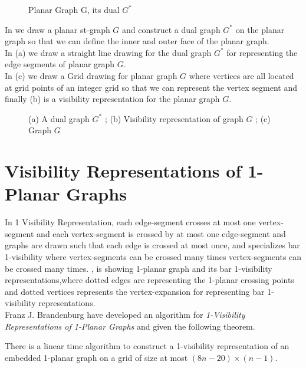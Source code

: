 \begin{figure}[!tb]
\centering
\resizebox{80mm}{!}{}
\caption{Planar Graph G, its dual $G^{*}$}
\label{fig:barvisidual}
\end{figure}




In  we draw a planar st-graph $G$ and construct a dual graph $G^{*}$ on the planar graph so that we can define the inner and outer face of the planar graph.
\\
In  (a) we draw a straight line drawing for the dual graph $G^{*}$ for representing the edge segments of planar graph $G$.
\\
In  (c) we draw a Grid drawing for planar graph $G$ where vertices are all located at grid points of an integer grid so that we can represent the vertex segment and finally  (b) is a visibility representation for the planar graph $G$.




\begin{figure}[!tb]
\centering
\resizebox{100mm}{!}{}
\caption{(a) A dual graph $G^{*}$ ; (b) Visibility representation of graph $G$ ; (c) Graph $G$}
\label{fig:barvisi}
\end{figure}



\section{Visibility Representations of 1-Planar Graphs}
\label{sec:1vr}


In 1 Visibility Representation, each edge-segment crosses at most one vertex-segment and each vertex-segment is crossed by at most one edge-segment and graphs are drawn such that each edge is crossed at most once\cite{FJ}, and specializes bar 1-visibility where vertex-segments can be crossed many times vertex-segments can be crossed many times. , is showing 1-planar graph and its bar 1-visibility representations,where dotted edges are representing the 1-planar crossing points and dotted vertices represents the vertex-expansion for representing bar 1-visibility representations. 
\\
Franz J. Brandenburg \cite{FJ} have developed an algorithm for \emph{1-Visibility Representations of 1-Planar Graphs} and given the following theorem.

\begin{theorem} 

There is a linear time algorithm to construct a 1-visibility representation of an embedded 1-planar graph on a grid of size at most $(8n-20) \times (n-1)$.

\end{theorem}





